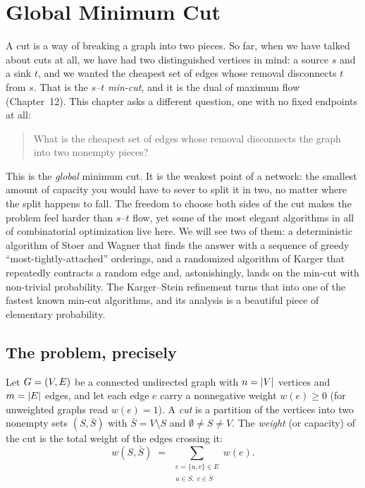 \chapter{Global Minimum Cut}

A cut is a way of breaking a graph into two pieces. So far, when we have talked about cuts at all, we have had two distinguished vertices in mind: a source $s$ and a sink $t$, and we wanted the cheapest set of edges whose removal disconnects $t$ from $s$. That is the \emph{$s$--$t$ min-cut}, and it is the dual of maximum flow (Chapter~12). This chapter asks a different question, one with no fixed endpoints at all:

\begin{quote}
What is the cheapest set of edges whose removal disconnects the graph into two nonempty pieces?
\end{quote}

This is the \emph{global} minimum cut. It is the weakest point of a network: the smallest amount of capacity you would have to sever to split it in two, no matter where the split happens to fall. The freedom to choose both sides of the cut makes the problem feel harder than $s$--$t$ flow, yet some of the most elegant algorithms in all of combinatorial optimization live here. We will see two of them: a deterministic algorithm of Stoer and Wagner that finds the answer with a sequence of greedy ``most-tightly-attached'' orderings, and a randomized algorithm of Karger that repeatedly contracts a random edge and, astonishingly, lands on the min-cut with non-trivial probability. The Karger--Stein refinement turns that into one of the fastest known min-cut algorithms, and its analysis is a beautiful piece of elementary probability.

\chapterline

\section{The problem, precisely}

Let $G=(V,E)$ be a connected undirected graph with $n=\lvert V\rvert$ vertices and $m=\lvert E\rvert$ edges, and let each edge $e$ carry a nonnegative weight $w(e)\ge 0$ (for unweighted graphs read $w(e)=1$). A \emph{cut} is a partition of the vertices into two nonempty sets $(S,\bar S)$ with $\bar S = V\setminus S$ and $\emptyset \neq S \neq V$. The \emph{weight} (or capacity) of the cut is the total weight of the edges crossing it:
\[
  w(S,\bar S) \;=\; \sum_{\substack{e=\{u,v\}\in E\\ u\in S,\ v\in\bar S}} w(e).
\]

